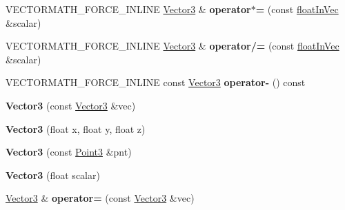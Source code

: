 \begin{DoxyCompactItemize}
\item 
\mbox{\label{classVectormath_1_1Aos_1_1Vector3_a042a0f245af81c9418f29fc0117b43b0}} 
V\+E\+C\+T\+O\+R\+M\+A\+T\+H\+\_\+\+F\+O\+R\+C\+E\+\_\+\+I\+N\+L\+I\+NE \hyperlink{classVectormath_1_1Aos_1_1Vector3}{Vector3} \& {\bfseries operator$\ast$=} (const \hyperlink{classVectormath_1_1floatInVec}{float\+In\+Vec} \&scalar)
\item 
\mbox{\label{classVectormath_1_1Aos_1_1Vector3_aaab5ddcc72b35d13f5e8f93c2345548b}} 
V\+E\+C\+T\+O\+R\+M\+A\+T\+H\+\_\+\+F\+O\+R\+C\+E\+\_\+\+I\+N\+L\+I\+NE \hyperlink{classVectormath_1_1Aos_1_1Vector3}{Vector3} \& {\bfseries operator/=} (const \hyperlink{classVectormath_1_1floatInVec}{float\+In\+Vec} \&scalar)
\item 
\mbox{\label{classVectormath_1_1Aos_1_1Vector3_ae8806ad886e1b54d12a8facf85bdc180}} 
V\+E\+C\+T\+O\+R\+M\+A\+T\+H\+\_\+\+F\+O\+R\+C\+E\+\_\+\+I\+N\+L\+I\+NE const \hyperlink{classVectormath_1_1Aos_1_1Vector3}{Vector3} {\bfseries operator-\/} () const
\item 
\mbox{\label{classVectormath_1_1Aos_1_1Vector3_ab31fe52fc7f99fed0017b3dab88d3901}} 
{\bfseries Vector3} (const \hyperlink{classVectormath_1_1Aos_1_1Vector3}{Vector3} \&vec)
\item 
\mbox{\label{classVectormath_1_1Aos_1_1Vector3_ae964bdcddf8a714f0a0153112ec29539}} 
{\bfseries Vector3} (float x, float y, float z)
\item 
\mbox{\label{classVectormath_1_1Aos_1_1Vector3_a1d0fd7e451ce2d15c5f4a779121eb21b}} 
{\bfseries Vector3} (const \hyperlink{classVectormath_1_1Aos_1_1Point3}{Point3} \&pnt)
\item 
\mbox{\label{classVectormath_1_1Aos_1_1Vector3_a25754eabd1008dc63ba5584e09e9ceb3}} 
{\bfseries Vector3} (float scalar)
\item 
\mbox{\label{classVectormath_1_1Aos_1_1Vector3_a0d5020f8cdc4af6230a744af3a2b12bc}} 
\hyperlink{classVectormath_1_1Aos_1_1Vector3}{Vector3} \& {\bfseries operator=} (const \hyperlink{classVectormath_1_1Aos_1_1Vector3}{Vector3} \&vec)

\end{DoxyCompactItemize}

